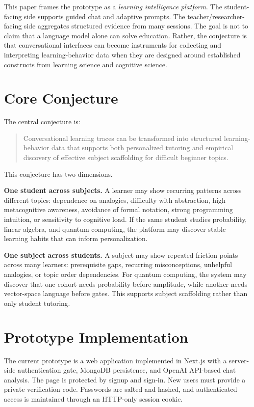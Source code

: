 \documentclass[11pt]{article}
\begin{document}
This paper frames the prototype as a \emph{learning intelligence platform}. The student-facing side supports guided chat and adaptive prompts. The teacher/researcher-facing side aggregates structured evidence from many sessions. The goal is not to claim that a language model alone can solve education. Rather, the conjecture is that conversational interfaces can become instruments for collecting and interpreting learning-behavior data when they are designed around established constructs from learning science and cognitive science.

\section{Core Conjecture}

The central conjecture is:

\begin{quote}
Conversational learning traces can be transformed into structured learning-behavior data that supports both personalized tutoring and empirical discovery of effective subject scaffolding for difficult beginner topics.
\end{quote}

This conjecture has two dimensions.

\textbf{One student across subjects.} A learner may show recurring patterns across different topics: dependence on analogies, difficulty with abstraction, high metacognitive awareness, avoidance of formal notation, strong programming intuition, or sensitivity to cognitive load. If the same student studies probability, linear algebra, and quantum computing, the platform may discover stable learning habits that can inform personalization.

\textbf{One subject across students.} A subject may show repeated friction points across many learners: prerequisite gaps, recurring misconceptions, unhelpful analogies, or topic order dependencies. For quantum computing, the system may discover that one cohort needs probability before amplitude, while another needs vector-space language before gates. This supports subject scaffolding rather than only student tutoring.

\section{Prototype Implementation}

The current prototype is a web application implemented in Next.js with a server-side authentication gate, MongoDB persistence, and OpenAI API-based chat analysis. The page is protected by signup and sign-in. New users must provide a private verification code. Passwords are salted and hashed, and authenticated access is maintained through an HTTP-only session cookie.
\end{document}
